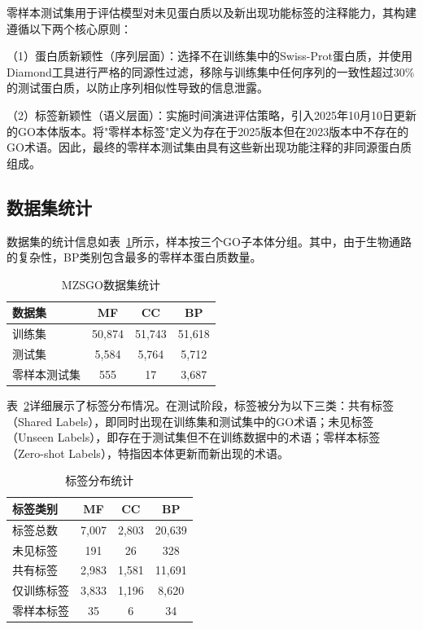 零样本测试集用于评估模型对未见蛋白质以及新出现功能标签的注释能力，其构建遵循以下两个核心原则：

（1）蛋白质新颖性（序列层面）：选择不在训练集中的Swiss-Prot蛋白质，并使用Diamond工具进行严格的同源性过滤，移除与训练集中任何序列的一致性超过30\%的测试蛋白质，以防止序列相似性导致的信息泄露。

（2）标签新颖性（语义层面）：实施时间演进评估策略，引入2025年10月10日更新的GO本体版本。将"零样本标签"定义为存在于2025版本但在2023版本中不存在的GO术语。因此，最终的零样本测试集由具有这些新出现功能注释的非同源蛋白质组成。

\subsection{数据集统计}

数据集的统计信息如表~\ref{tab:mzsgo_dataset_stats}所示，样本按三个GO子本体分组。其中，由于生物通路的复杂性，BP类别包含最多的零样本蛋白质数量。

\begin{table}[h]
\centering
\caption{MZSGO数据集统计}
\label{tab:mzsgo_dataset_stats}
\small
\begin{tabular}{lccc}
\toprule
数据集 & MF & CC & BP \\
\midrule
训练集 & 50,874 & 51,743 & 51,618 \\
测试集 & 5,584 & 5,764 & 5,712 \\
零样本测试集 & 555 & 17 & 3,687 \\
\bottomrule
\end{tabular}
\end{table}

表~\ref{tab:mzsgo_label_stats}详细展示了标签分布情况。在测试阶段，标签被分为以下三类：共有标签（Shared Labels），即同时出现在训练集和测试集中的GO术语；未见标签（Unseen Labels），即存在于测试集但不在训练数据中的术语；零样本标签（Zero-shot Labels），特指因本体更新而新出现的术语。

\begin{table}[h]
\centering
\caption{标签分布统计}
\label{tab:mzsgo_label_stats}
\small
\begin{tabular}{lccc}
\toprule
标签类别 & MF & CC & BP \\
\midrule
标签总数 & 7,007 & 2,803 & 20,639 \\
未见标签 & 191 & 26 & 328 \\
共有标签 & 2,983 & 1,581 & 11,691 \\
仅训练标签 & 3,833 & 1,196 & 8,620 \\
零样本标签 & 35 & 6 & 34 \\
\bottomrule
\end{tabular}
\end{table}

